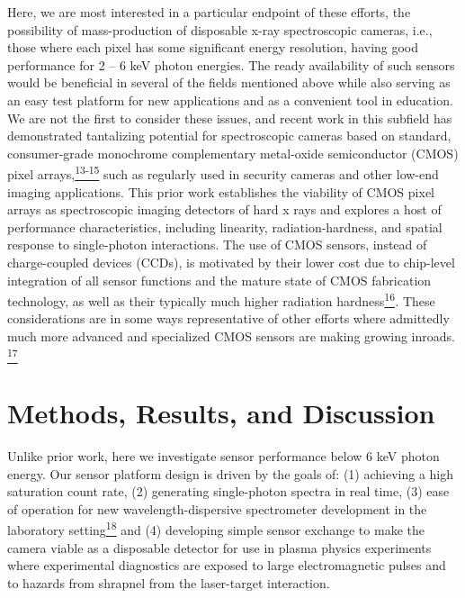 Here, we are most interested in a particular endpoint of these efforts,
the possibility of mass-production of disposable x-ray spectroscopic
cameras, i.e., those where each pixel has some significant energy
resolution, having good performance for 2 -- 6 keV photon energies. The
ready availability of such sensors would be beneficial in several of the
fields mentioned above while also serving as an easy test platform for
new applications and as a convenient tool in education. We are not the
first to consider these issues, and recent work in this subfield has
demonstrated tantalizing potential for spectroscopic cameras based on
standard, consumer-grade monochrome complementary metal-oxide
semiconductor (CMOS) pixel
arrays,\hyperref[ux5fENREFux5f13]{\textsuperscript{13-15}} such as
regularly used in security cameras and other low-end imaging
applications. This prior work establishes the viability of CMOS pixel
arrays as spectroscopic imaging detectors of hard x rays and explores a
host of performance characteristics, including linearity,
radiation-hardness, and spatial response to single-photon interactions.
The use of CMOS sensors, instead of charge-coupled devices (CCDs), is
motivated by their lower cost due to chip-level integration of all
sensor functions and the mature state of CMOS fabrication technology, as
well as their typically much higher radiation
hardness\hyperref[ux5fENREFux5f16]{\textsuperscript{16}}\emph{.} These
considerations are in some ways representative of other efforts where
admittedly much more advanced and specialized CMOS sensors are making
growing inroads. \hyperref[ux5fENREFux5f17]{\textsuperscript{17}}

\section{Methods, Results, and Discussion}
Unlike prior work, here we investigate sensor performance below 6 keV
photon energy. Our sensor platform design is driven by the goals of: (1)
achieving a high saturation count rate, (2) generating single-photon
spectra in real time, (3) ease of operation for new
wavelength-dispersive spectrometer development in the laboratory
setting\hyperref[ux5fENREFux5f18]{\textsuperscript{18}} and (4)
developing simple sensor exchange to make the camera viable as a
disposable detector for use in plasma physics experiments where
experimental diagnostics are exposed to large electromagnetic pulses and
to hazards from shrapnel from the laser-target interaction.

